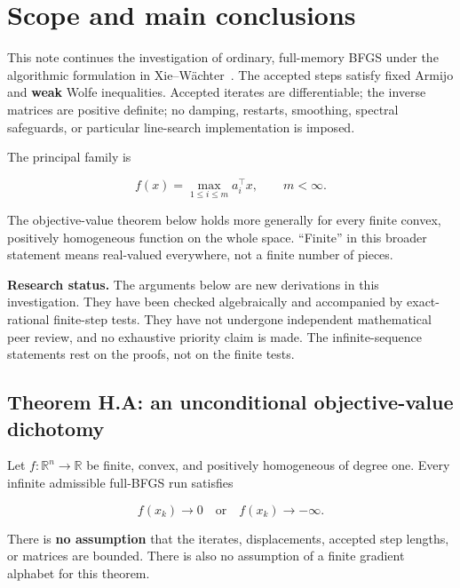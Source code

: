 \begingroup

\setcounter{section}{0}
\setcounter{theorem}{0}
\setcounter{lemma}{0}
\setcounter{corollary}{0}
\setcounter{proposition}{0}
\setcounter{remark}{0}
\setcounter{equation}{0}
\section{Scope and main
conclusions}\label{H:scope-and-main-conclusions}

This note continues the investigation of ordinary, full-memory BFGS
under the algorithmic formulation in Xie--W\"achter~\cite{XW}. The accepted
steps satisfy fixed Armijo and \textbf{weak} Wolfe inequalities.
Accepted iterates are differentiable; the inverse matrices are positive
definite; no damping, restarts, smoothing, spectral safeguards, or
particular line-search implementation is imposed.

The principal family is

\[
f(x)=\max_{1\le i\le m}a_i^\top x,\qquad m<\infty.
\]

The objective-value theorem below holds more generally for every finite
convex, positively homogeneous function on the whole space. ``Finite''
in this broader statement means real-valued everywhere, not a finite
number of pieces.

\textbf{Research status.} The arguments below are new derivations in
this investigation. They have been checked algebraically and accompanied
by exact-rational finite-step tests. They have not undergone independent
mathematical peer review, and no exhaustive priority claim is made. The
infinite-sequence statements rest on the proofs, not on the finite
tests.

\subsection{Theorem H.A: an unconditional objective-value
dichotomy}\label{H:theorem-a-an-unconditional-objective-value-dichotomy}

Let \(f:\mathbb R^n\to\mathbb R\) be finite, convex, and positively
homogeneous of degree one. Every infinite admissible full-BFGS run
satisfies

\[
\boxed{f(x_k)\longrightarrow0\quad\text{or}\quad f(x_k)\longrightarrow-\infty.}
\]

There is \textbf{no assumption} that the iterates, displacements,
accepted step lengths, or matrices are bounded. There is also no
assumption of a finite gradient alphabet for this theorem.

